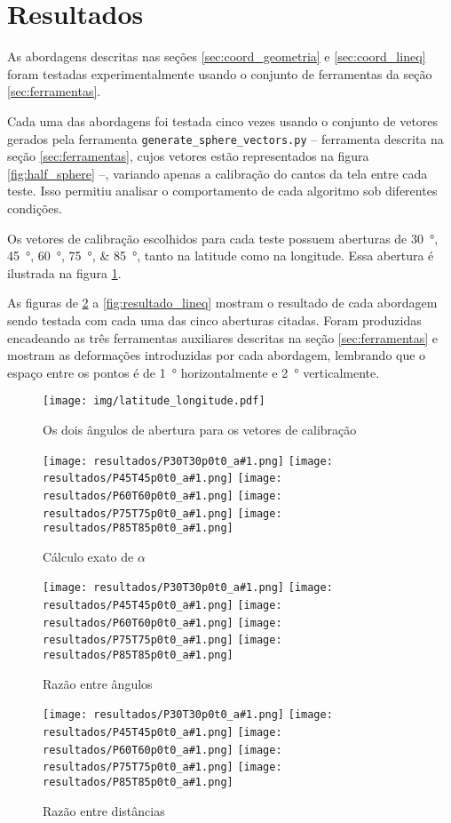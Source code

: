 \documentclass[brazil,pagestart=firstchapter]{abnt}
\newcommand*{\resultadoimagens}[1]{
	\texttt{[image: resultados/P30T30p0t0\_a\#1.png]}
	\texttt{[image: resultados/P45T45p0t0\_a\#1.png]}
	\texttt{[image: resultados/P60T60p0t0\_a\#1.png]}
	\texttt{[image: resultados/P75T75p0t0\_a\#1.png]}
	\texttt{[image: resultados/P85T85p0t0\_a\#1.png]}
}
\begin{document}
\section{Resultados}
\label{sec:coord_resultados}

As abordagens descritas nas seções \ref{sec:coord_geometria} e
\ref{sec:coord_lineq} foram testadas experimentalmente usando o conjunto de
ferramentas da seção \ref{sec:ferramentas}.

Cada uma das abordagens foi testada cinco vezes usando o conjunto de vetores
gerados pela ferramenta \texttt{generate\_sphere\_vectors.py} -- ferramenta
descrita na seção \ref{sec:ferramentas}, cujos vetores estão representados
na figura \ref{fig:half_sphere} --, variando apenas a calibração do cantos
da tela entre cada teste. Isso permitiu analisar o comportamento de cada
algoritmo sob diferentes condições.

Os vetores de calibração escolhidos para cada teste possuem aberturas de
\SIlist{30;45;60;75;85}{\degree}, tanto na latitude como na longitude. Essa
abertura é ilustrada na figura \ref{fig:latitude_longitude}.

As figuras de \ref{fig:resultado_exact} a \ref{fig:resultado_lineq} mostram
o resultado de cada abordagem sendo testada com cada uma das cinco aberturas
citadas. Foram produzidas encadeando as três ferramentas auxiliares
descritas na seção \ref{sec:ferramentas} e mostram as deformações
introduzidas por cada abordagem, lembrando que o espaço entre os pontos é de
\SI{1}{\degree} horizontalmente e \SI{2}{\degree} verticalmente.

\begin{figure}[h]
\centering
\texttt{[image: img/latitude\_longitude.pdf]}
\caption{Os dois ângulos de abertura para os vetores de calibração}
\label{fig:latitude_longitude}
\end{figure}

\begin{figure}
\centering
\resultadoimagens{12}
\caption{Cálculo exato de $\alpha$}
\label{fig:resultado_exact}
\end{figure}

\begin{figure}
\centering
\resultadoimagens{7}
\caption{Razão entre ângulos}
\label{fig:resultado_angulo}
\end{figure}

\begin{figure}
\centering
\resultadoimagens{11}
\caption{Razão entre distâncias}
\label{fig:resultado_dist}
\end{figure}
\end{document}
